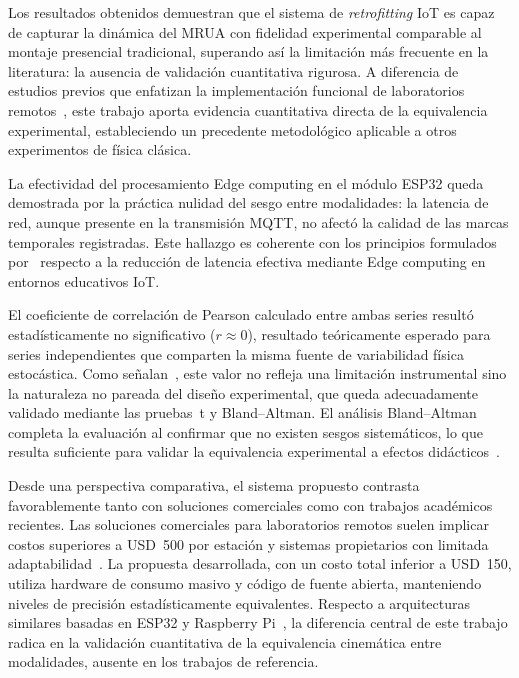 \documentclass{espol-rte}
\begin{document}
Los resultados obtenidos demuestran que el sistema de \textit{retrofitting} IoT es capaz de capturar la din\'amica del MRUA con fidelidad experimental comparable al montaje presencial tradicional, superando as\'i la limitaci\'on m\'as frecuente en la literatura: la ausencia de validaci\'on cuantitativa rigurosa. A diferencia de estudios previos que enfatizan la implementaci\'on funcional de laboratorios remotos~\parencite{r2,r5}, este trabajo aporta evidencia cuantitativa directa de la equivalencia experimental, estableciendo un precedente metodol\'ogico aplicable a otros experimentos de f\'isica cl\'asica.

La efectividad del procesamiento Edge computing en el m\'odulo ESP32 queda demostrada por la pr\'actica nulidad del sesgo entre modalidades: la latencia de red, aunque presente en la transmisi\'on MQTT, no afect\'o la calidad de las marcas temporales registradas. Este hallazgo es coherente con los principios formulados por~\textcite{r7} respecto a la reducci\'on de latencia efectiva mediante Edge computing en entornos educativos IoT.

El coeficiente de correlaci\'on de Pearson calculado entre ambas series result\'o estad\'isticamente no significativo ($r \approx 0$), resultado te\'oricamente esperado para series independientes que comparten la misma fuente de variabilidad f\'isica estoc\'astica. Como se\~nalan~\textcite{giavarina2015}, este valor no refleja una limitaci\'on instrumental sino la naturaleza no pareada del dise\~no experimental, que queda adecuadamente validado mediante las pruebas~t y Bland--Altman. El an\'alisis Bland--Altman completa la evaluaci\'on al confirmar que no existen sesgos sistem\'aticos, lo que resulta suficiente para validar la equivalencia experimental a efectos did\'acticos~\parencite{bland1986}.

Desde una perspectiva comparativa, el sistema propuesto contrasta favorablemente tanto con soluciones comerciales como con trabajos acad\'emicos recientes. Las soluciones comerciales para laboratorios remotos suelen implicar costos superiores a USD~500 por estaci\'on y sistemas propietarios con limitada adaptabilidad~\parencite{r4}. La propuesta desarrollada, con un costo total inferior a USD~150, utiliza hardware de consumo masivo y c\'odigo de fuente abierta, manteniendo niveles de precisi\'on estad\'isticamente equivalentes. Respecto a arquitecturas similares basadas en ESP32 y Raspberry Pi~\parencite{r10}, la diferencia central de este trabajo radica en la validaci\'on cuantitativa de la equivalencia cinem\'atica entre modalidades, ausente en los trabajos de referencia.
\end{document}
